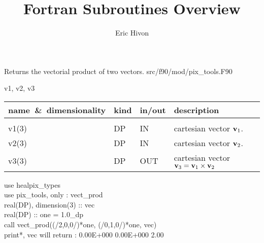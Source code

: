
\sloppy


\title{\healpix Fortran Subroutines Overview}
 \section[vect\_prod]{ }
\label{sub:vect_prod}
\author{Eric Hivon}

\begin{facility}
{Returns the vectorial product of two vectors.} 
{src/f90/mod/pix\_tools.F90}
\end{facility}

\begin{f90format}
{v1, v2, v3}
\end{f90format}

\begin{arguments}
{
\begin{tabular}{p{0.3\hsize} p{0.05\hsize} p{0.1\hsize} p{0.45\hsize}} \hline 
\textbf{name~\&~dimensionality} & \textbf{kind} & \textbf{in/out} & \textbf{description} \\ \hline
                   &   &   &                           \\ %
v1(3) & DP & IN & cartesian vector ${\bf v}_1$. \\
v2(3) & DP & IN & cartesian vector ${\bf v}_2$. \\
v3(3) & DP & OUT & cartesian vector ${\bf v}_3 = {\bf v}_1 \times {\bf v}_2$ \\
\end{tabular}
}
\end{arguments}

\begin{example}
{
use healpix\_types \\
use pix\_tools,    only : vect\_prod \\
real(DP), dimension(3) :: vec\\
real(DP) :: one = 1.0\_dp \\
call vect\_prod((/2,0,0/)*one, (/0,1,0/)*one, vec)  \\
print*, vec
}
{
will return : 0.00E+000  0.00E+000   2.00
}
\end{example}

